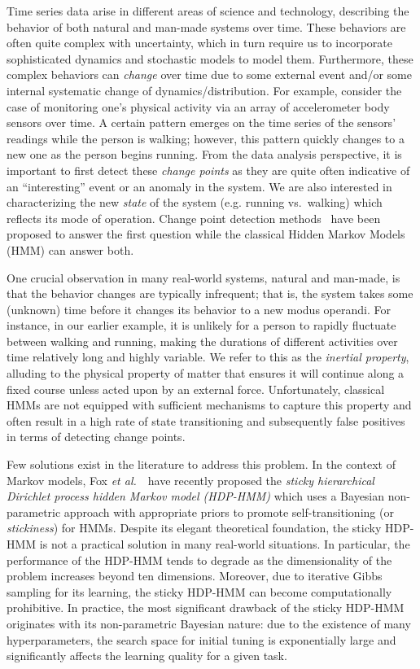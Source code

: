 \documentclass[letterpaper]{article}
\begin{document}
Time series data arise in different areas of science and technology, describing
the behavior of both natural and man-made systems over time. These
behaviors are often quite complex with uncertainty, which in turn require us to
incorporate sophisticated dynamics and stochastic models to model them.
Furthermore, these complex behaviors can \emph{change} over time due to some external event and/or some internal
systematic change of dynamics/distribution. For example, consider the case of
monitoring one's physical activity via an array of accelerometer body sensors
over time. A certain pattern emerges on the time series of the sensors' readings
while the person is walking; however, this pattern quickly changes to a new one
as the person begins running. From the data analysis perspective, it is
important to first detect these \emph{change points} as they are quite often
indicative of an ``interesting'' event or an anomaly in the system. We
are also interested in characterizing the new \emph{state} of the system (e.g. running vs.\
walking) which reflects its mode of operation. Change point detection methods~\cite{kawahara2007change,xie2013change} have been proposed
to answer the first question while the classical Hidden Markov Models (HMM) can
answer both.

One crucial observation in many real-world systems, natural and man-made, is that the behavior changes are typically infrequent; that is, the
system takes some (unknown) time before it changes its behavior to a new modus operandi. For
instance, in our earlier example, it is unlikely for a person to rapidly fluctuate between
walking and running, making the durations of different
activities over time relatively long and highly variable. We refer to this as the
\emph{inertial property}, alluding to the physical property of matter that
ensures it will continue along a fixed course unless acted upon by an external
force. Unfortunately, classical HMMs are not equipped with sufficient
mechanisms to capture this property and often result in a high rate of
state transitioning and subsequently false positives in terms of detecting
change points.

Few solutions exist in the literature to address this problem. In
the context of Markov models, Fox \emph{et al.}~\cite{fox2011sticky,willsky2009nonparametric}\ have
recently proposed the \emph{sticky hierarchical Dirichlet process hidden Markov
model (HDP-HMM)} which uses a Bayesian non-parametric approach with appropriate
priors to promote self-transitioning (or \emph{stickiness}) for HMMs. Despite its
elegant theoretical foundation, the sticky HDP-HMM is not a practical solution in many real-world situations.
In particular, the performance of the HDP-HMM tends to degrade as the
dimensionality of the problem increases beyond ten dimensions. Moreover, due to 
iterative Gibbs sampling for its learning, the sticky HDP-HMM can become computationally prohibitive. 
In practice, the most significant drawback of the sticky HDP-HMM originates with its non-parametric 
Bayesian nature: due to the existence of many hyperparameters, the search space for initial tuning is 
exponentially large and significantly affects the learning quality for a given task.
\end{document}
